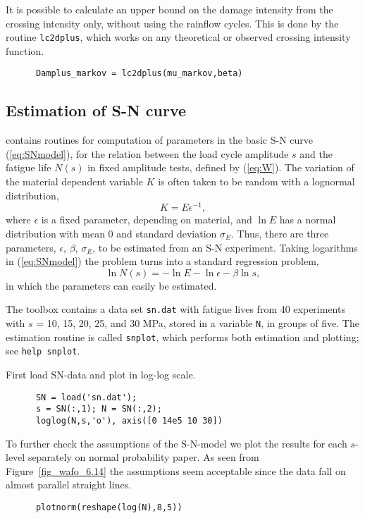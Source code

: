 It is possible to calculate an upper bound on the damage intensity
from the crossing intensity only, without using the rainflow cycles.
This is done by the routine {\tt lc2dplus}, which works
on any theoretical or observed crossing intensity function.
{\small\begin{verbatim}
      Damplus_markov = lc2dplus(mu_markov,beta)
\end{verbatim}}

\subsection{Estimation of S-N curve}\label{sec:estimationofSNcurve}

\progname{} contains routines for computation of parameters in the
basic S-N curve (\ref{eq:SNmodel}), for the relation between the load cycle
amplitude $s$ and the fatigue life $N(s)$ in fixed amplitude tests,
defined by (\ref{eq:W}).
The variation of the material dependent variable $K$ is often
taken to be random with a lognormal distribution,
$$
K = E \epsilon ^{-1},
$$
where $\epsilon$ is a fixed parameter, depending on material,
and $\ln E$ has a normal distribution with mean $0$ and
standard deviation $\sigma _E$. Thus, there are three
parameters, $\epsilon$, $\beta$, $\sigma _E$,
to be estimated from an S-N experiment.
Taking logarithms in (\ref{eq:SNmodel})
the problem turns into a standard regression problem,
$$
\ln N(s) = - \ln E - \ln \epsilon - \beta \ln s,
$$
in which the parameters can easily be estimated.

The \progname{} toolbox contains a data set {\tt sn.dat}
with fatigue lives from 40 experiments with
$s$ = 10, 15, 20, 25, and 30 MPa, stored in a variable \verb+N+,
in groups of five.
The estimation routine is called {\tt snplot},
which performs both estimation and
plotting; see {\tt help snplot}.

First load SN-data and plot in log-log scale.
{\small\begin{verbatim}
      SN = load('sn.dat');
      s = SN(:,1); N = SN(:,2);
      loglog(N,s,'o'), axis([0 14e5 10 30])
\end{verbatim}}
To further check the assumptions of the S-N-model
we plot the results for each $s$-level separately on normal
probability paper. As seen from Figure~\ref{fig_wafo_6.14}
the assumptions seem acceptable since the data fall on
almost parallel straight lines.
{\small\begin{verbatim}
      plotnorm(reshape(log(N),8,5))
\end{verbatim}}

